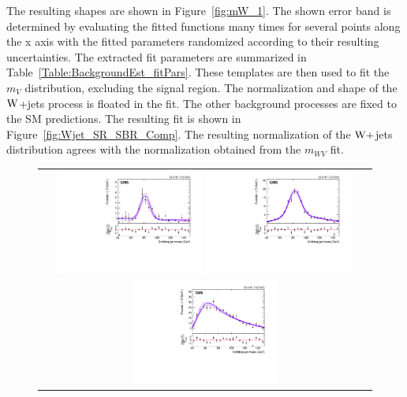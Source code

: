 The resulting shapes are shown in Figure~\ref{fig:mW_1}. The shown error band is determined by evaluating the fitted functions many times for several points along the x axis with the fitted parameters randomized according to their resulting uncertainties. The extracted fit parameters are summarized in Table~\ref{Table:BackgroundEst_fitPars}. These templates are then used to fit the $m_{V}$ distribution, excluding the signal region. The normalization and shape of the  $\mathrm{W}$+jets process is floated in the fit. The other background processes are fixed to the SM predictions. The resulting fit is shown in Figure~\ref{fig:Wjet_SR_SBR_Comp}. The resulting normalization of the $\mathrm{W}+$jets distribution agrees with the normalization obtained from the $m_{WV}$ fit.
\begin{figure}[!htbp] 
	 \centering 
	 \begin{tabular}{c}
	 \includegraphics[width=0.45\textwidth]{Plots/BackgroundEstimation/WV/m_j_fitting/_STop_xwwWWTree_STop_ExpGaus_with_pull.pdf}%
	 \includegraphics[width=0.45\textwidth]{Plots/BackgroundEstimation/WV/m_j_fitting/_TTbar_xwwWWTree_TTbar_2Gaus_ErfExp_with_pull.pdf}\\
	 \includegraphics[width=0.45\textwidth]{Plots/BackgroundEstimation/WV/m_j_fitting/_WJets01_xwwWWTree_VJets_ErfExp_with_pull.pdf}%

\end{tabular}
\end{figure}
